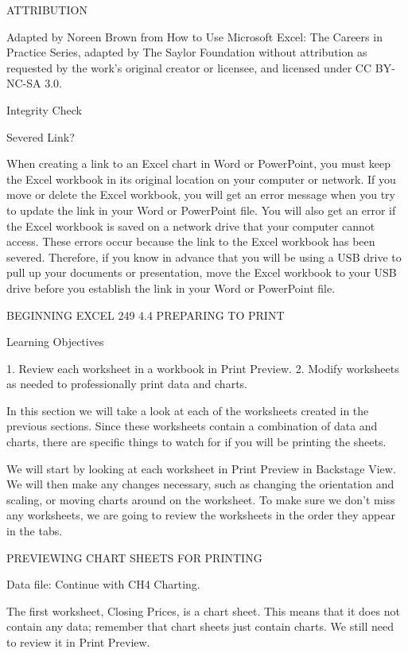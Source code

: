 ATTRIBUTION

Adapted by Noreen Brown from How to Use Microsoft Excel: The Careers in Practice Series, adapted
by The Saylor Foundation without attribution as requested by the work’s original creator or
licensee, and licensed under CC BY-NC-SA 3.0.




Integrity Check

Severed Link?

When creating a link to an Excel chart in Word or PowerPoint, you must keep the Excel workbook in its original
location on your computer or network. If you move or delete the Excel workbook, you will get an error message
when you try to update the link in your Word or PowerPoint file. You will also get an error if the Excel workbook
is saved on a network drive that your computer cannot access. These errors occur because the link to the Excel
workbook has been severed. Therefore, if you know in advance that you will be using a USB drive to pull up your
documents or presentation, move the Excel workbook to your USB drive before you establish the link in your Word
or PowerPoint file.




BEGINNING EXCEL 249
4.4 PREPARING TO PRINT




Learning Objectives


1. Review each worksheet in a workbook in Print Preview.
2. Modify worksheets as needed to professionally print data and charts.



In this section we will take a look at each of the worksheets created in the previous sections. Since
these worksheets contain a combination of data and charts, there are specific things to watch for if
you will be printing the sheets.

We will start by looking at each worksheet in Print Preview in Backstage View. We will then make
any changes necessary, such as changing the orientation and scaling, or moving charts around on the
worksheet. To make sure we don’t miss any worksheets, we are going to review the worksheets in the
order they appear in the tabs.

PREVIEWING CHART SHEETS FOR PRINTING

Data file: Continue with CH4 Charting.

The first worksheet, Closing Prices, is a chart sheet. This means that it does not contain any data;
remember that chart sheets just contain charts. We still need to review it in Print Preview.

